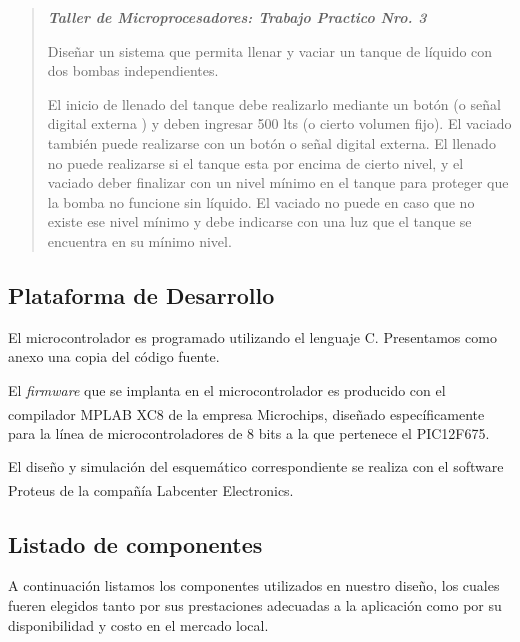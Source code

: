 \documentclass[a4paper]{article}
\let\originalcite\cite
\renewcommand{\cite}[2][]{\textsuperscript{\originalcite{#2}}}
\begin{document}
\begin{quotation}

    \begin{center}\textit{\textbf{%
        Taller de Microprocesadores: Trabajo Practico Nro. 3%
    }}\end{center}\vspace{1em}

    Diseñar un sistema que permita llenar y vaciar un tanque de líquido 
    con dos bombas independientes. 

    El inicio de llenado del tanque debe realizarlo mediante un botón 
    (o señal digital externa ) y deben ingresar 500 lts (o cierto volumen 
    fijo). El vaciado también puede realizarse con un botón o señal 
    digital externa. El llenado no puede realizarse si el tanque esta por 
    encima de cierto nivel, y el vaciado deber finalizar con un nivel 
    mínimo en el tanque para proteger que la bomba no funcione sin 
    líquido. El vaciado no puede en caso que no existe ese nivel mínimo y 
    debe indicarse con una luz que el tanque se encuentra en su mínimo 
    nivel.

\end{quotation}

\subsection{Plataforma de Desarrollo}

El microcontrolador es programado utilizando el lenguaje C. 
Presentamos como anexo una copia del código fuente.

El \textit{firmware} que se implanta en el microcontrolador es  
producido con el compilador MPLAB XC8\cite{bib:compilador} de la 
empresa Microchips, diseñado específicamente para la línea de 
microcontroladores de 8 bits a la que pertenece el PIC12F675.

El diseño y simulación del esquemático correspondiente se realiza 
con el software Proteus\cite{bib:simulador} de la compañía 
Labcenter Electronics.

\subsection{Listado de componentes}

A continuación listamos los componentes utilizados en nuestro diseño,
los cuales fueren elegidos tanto por sus prestaciones adecuadas a la 
aplicación como por su disponibilidad y costo en el mercado local.
\end{document}
